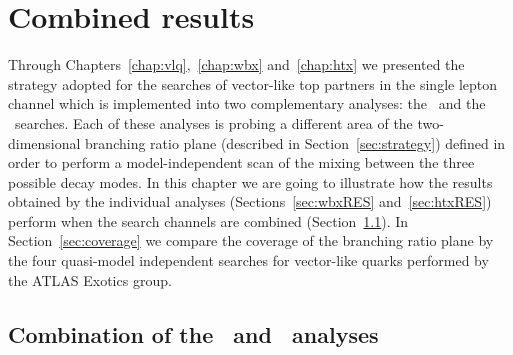 \clearpage{\pagestyle{empty}\cleardoublepage}

\chapter{Combined results}\label{chap:results}

Through Chapters~\ref{chap:vlq},~\ref{chap:wbx} and~\ref{chap:htx}
we presented the strategy adopted for the searches of vector-like
top partners in the single lepton channel which is implemented into
two complementary analyses: the \wbx\ and the \htx\ searches.
Each of these analyses is probing a different
area of the two-dimensional branching ratio plane
(described in Section~\ref{sec:strategy}) 
defined in order to perform
a model-independent scan of the mixing between the 
three possible decay modes.
In this chapter we are going to illustrate how the results
obtained by the individual analyses (Sections~\ref{sec:wbxRES} 
and~\ref{sec:htxRES}) perform when the search channels are
combined (Section~\ref{sec:results_comb}).
In Section~\ref{sec:coverage} we compare
the coverage of the branching ratio plane by the four quasi-model independent
searches for vector-like quarks performed
by the ATLAS Exotics group.


\section{Combination of the \wbx\ and \htx\ analyses}\label{sec:results_comb}

